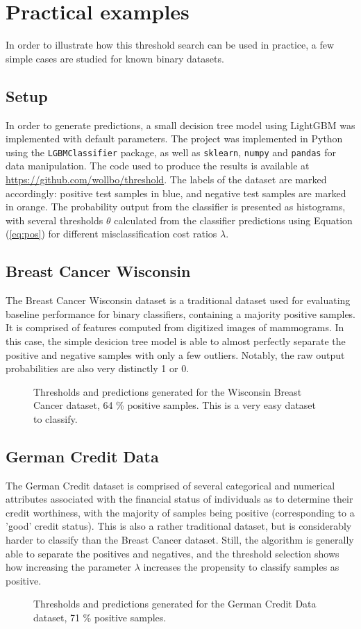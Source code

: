 \documentclass{article}
\begin{document}
\section{Practical examples}
In order to illustrate how this threshold search can be used in practice, a few simple cases are studied for known binary datasets.
\subsection{Setup}
In order to generate predictions, a small decision tree model using LightGBM was implemented with default parameters. The project was implemented in Python using the \texttt{LGBMClassifier} package, as well as \texttt{sklearn}, \texttt{numpy} and \texttt{pandas} for data manipulation. The code used to produce the results is available at \url{https://github.com/wollbo/threshold}. The labels of the dataset are marked accordingly: positive test samples in blue, and negative test samples are marked in orange. The probability output from the classifier is presented as histograms, with several thresholds $\theta$ calculated from the classifier predictions using Equation (\ref{eq:pos}) for different misclassification cost ratios $\lambda$.
\subsection{Breast Cancer Wisconsin}
The Breast Cancer Wisconsin dataset is a traditional dataset used for evaluating baseline performance for binary classifiers, containing a majority positive samples. It is comprised of features computed from digitized images of mammograms. In this case, the simple desicion tree model is able to almost perfectly separate the positive and negative samples with only a few outliers. Notably, the raw output probabilities are also very distinctly 1 or 0.
\begin{figure}[H]
    \centering
    \scalebox{.8}{}
    \caption{Thresholds and predictions generated for the Wisconsin Breast Cancer dataset, 64 \% positive samples. This is a very easy dataset to classify.}
\end{figure}

\subsection{German Credit Data}
The German Credit dataset is comprised of several categorical and numerical attributes associated with the financial status of individuals as to determine their credit worthiness, with the majority of samples being positive (corresponding to a 'good' credit status). This is also a rather traditional dataset, but is considerably harder to classify than the Breast Cancer dataset. Still, the algorithm is generally able to separate the positives and negatives, and the threshold selection shows how increasing the parameter $\lambda$ increases the propensity to classify samples as positive.
\begin{figure}[H]
    \centering
    \scalebox{.8}{}
    \caption{Thresholds and predictions generated for the German Credit Data dataset, 71 \% positive samples.}
\end{figure}
\end{document}
